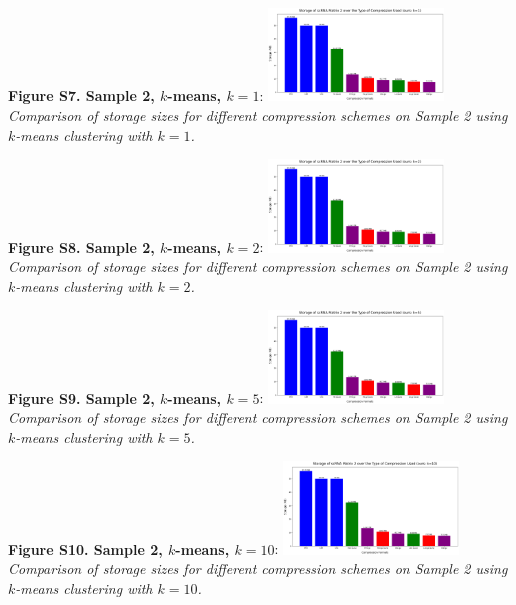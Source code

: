 \documentclass[unnumsec,webpdf,contemporary,large]{oup-authoring-template}
\begin{document}
\textbf{Figure S7. Sample 2, $k$-means, $k=1$}:
\newline
\includegraphics[width=0.35\textwidth]{compressed/kmeans/sample2/k1/storage_comparisons.png}\\
\textit{Comparison of storage sizes for different compression schemes on Sample 2 using $k$-means clustering with $k=1$.}

\textbf{Figure S8. Sample 2, $k$-means, $k=2$}:
\newline
\includegraphics[width=0.35\textwidth]{compressed/kmeans/sample2/k2/storage_comparisons.png}\\
\textit{Comparison of storage sizes for different compression schemes on Sample 2 using $k$-means clustering with $k=2$.}

\textbf{Figure S9. Sample 2, $k$-means, $k=5$}:
\newline
\includegraphics[width=0.35\textwidth]{compressed/kmeans/sample2/k5/storage_comparisons.png}\\
\textit{Comparison of storage sizes for different compression schemes on Sample 2 using $k$-means clustering with $k=5$.}

\textbf{Figure S10. Sample 2, $k$-means, $k=10$}:
\newline
\includegraphics[width=0.35\textwidth]{compressed/kmeans/sample2/k10/storage_comparisons.png}\\
\textit{Comparison of storage sizes for different compression schemes on Sample 2 using $k$-means clustering with $k=10$.}
\end{document}
